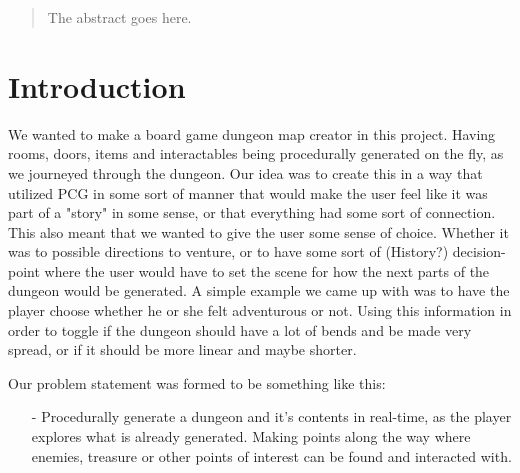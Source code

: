 \documentclass[conference,compsoc]{IEEEtran}
\begin{document}




\maketitle

\begin{abstract}
The abstract goes here.
\end{abstract}





%
\IEEEpeerreviewmaketitle



\section{Introduction}
We wanted to make a board game dungeon map creator in this project. Having rooms, doors, items and interactables being procedurally generated on the fly, as we journeyed through the dungeon. Our idea was to create this in a way that utilized PCG in some sort of manner that would make the user feel like it was part of a "story" in some sense, or that everything had some sort of connection. This also meant that we wanted to give the user some sense of choice. Whether it was to possible directions to venture, or to have some sort of (History?) decision-point where the user would have to set the scene for how the next parts of the dungeon would be generated. A simple example we came up with was to have the player choose whether he or she felt adventurous or not. Using this information in order to toggle if the dungeon should have a lot of bends and be made very spread, or if it should be more linear and maybe shorter.

Our problem statement was formed to be something like this:
\begin{itemize}
\item[-] Procedurally generate a dungeon and it's contents in real-time, as the player explores what is already generated. Making points along the way where enemies, treasure or other points of interest can be found and interacted with.
\end{itemize}
\end{document}
